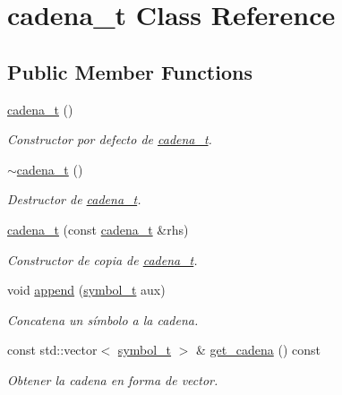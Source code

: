 \hypertarget{classcadena__t}{}\section{cadena\+\_\+t Class Reference}
\label{classcadena__t}
\subsection*{Public Member Functions}
\begin{DoxyCompactItemize}
\item 
\mbox{\label{classcadena__t_a1fc88b521c8d6fab38dc5be44c10d2a5}} 
\hyperlink{classcadena__t_a1fc88b521c8d6fab38dc5be44c10d2a5}{cadena\+\_\+t} ()
\begin{DoxyCompactList}\small\item\em Constructor por defecto de \hyperlink{classcadena__t}{cadena\+\_\+t}. \end{DoxyCompactList}\item 
\mbox{\label{classcadena__t_a1ea83832240f867aa50ccc2dfd9351fe}} 
\hyperlink{classcadena__t_a1ea83832240f867aa50ccc2dfd9351fe}{$\sim$cadena\+\_\+t} ()
\begin{DoxyCompactList}\small\item\em Destructor de \hyperlink{classcadena__t}{cadena\+\_\+t}. \end{DoxyCompactList}\item 
\hyperlink{classcadena__t_accad06f41be0debb029950908bd1bd4a}{cadena\+\_\+t} (const \hyperlink{classcadena__t}{cadena\+\_\+t} \&rhs)
\begin{DoxyCompactList}\small\item\em Constructor de copia de \hyperlink{classcadena__t}{cadena\+\_\+t}. \end{DoxyCompactList}\item 
void \hyperlink{classcadena__t_a71622adf07f846ab794250ea49914c9a}{append} (\hyperlink{classsymbol__t}{symbol\+\_\+t} aux)
\begin{DoxyCompactList}\small\item\em Concatena un símbolo a la cadena. \end{DoxyCompactList}\item 
const std\+::vector$<$ \hyperlink{classsymbol__t}{symbol\+\_\+t} $>$ \& \hyperlink{classcadena__t_a31b03c4d2759474af12ce90c51ba6396}{get\+\_\+cadena} () const
\begin{DoxyCompactList}\small\item\em Obtener la cadena en forma de vector. \end{DoxyCompactList}\item 

\end{DoxyCompactItemize}
